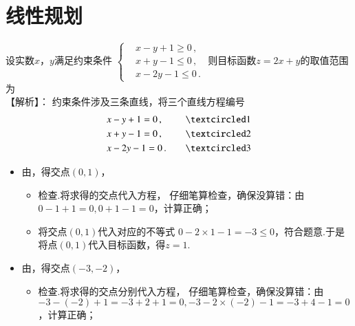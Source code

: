 \section{线性规划}
  \begin{exercise}
    \item %
      设实数$x$，$y$满足约束条件
      $\left\{\begin{aligned}
        &x-y+1\geqslant0\,,\\
        &x+y-1\leqslant0\,,\\
        &x-2y-1\leqslant0\,.
      \end{aligned}\right.$
      则目标函数$z=2x+y$的取值范围为\xz
      \xx{$[1,+\infty)$}{$[2,+\infty)$}{$[-8,1]$}{$[-8,2]$}
        \\{\heiti 【解析】：}
          约束条件涉及三条直线，将三个直线方程编号
          \[\begin{aligned}
            &x-y+1=0\,,\quad &\circled{1}\\
            &x+y-1=0\,,\quad &\circled{2}\\
            &x-2y-1=0\,.\quad &\circled{3}
          \end{aligned}\]
          \begin{itemize}
            \item 由，得交点$(0,1)$，
              \begin{itemize}
                \item 检查.{\kaishu 将求得的交点代入方程，
                  仔细笔算检查，确保没算错：由$0-1+1=0,0+1-1=0$，计算正确；}
                \item 将交点$(0,1)$代入对应的不等式
                  $0-2\times1-1=-3\leqslant0$，符合题意.于是将点$(0,1)$代入目标函数，得$z=1$.
              \end{itemize}
            \item 由，得交点$(-3,-2)$，
              \begin{itemize}
                \item 检查.{\kaishu 将求得的交点分别代入方程，
                  仔细笔算检查，确保没算错：由$-3-(-2)+1=-3+2+1=0,-3-2\times(-2)-1=-3+4-1=0$，计算正确；}

\end{itemize}
\end{itemize}
\end{exercise}
